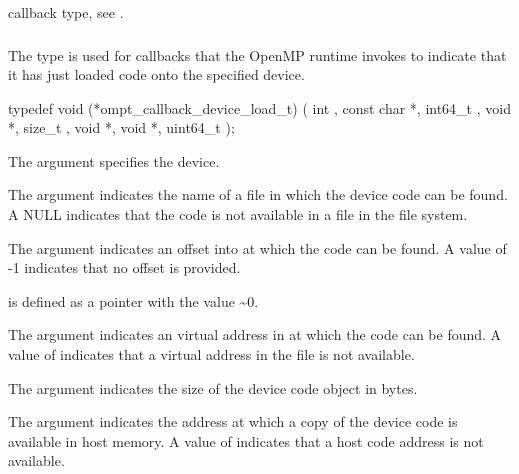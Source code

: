 \begin{crossrefs}
\item {} callback type, 
see .
\end{crossrefs}
\subsubsection{}
\label{sec:ompt_callback_device_load_t}

\summary
The  type is used for callbacks that 
the OpenMP runtime invokes to indicate that it has just loaded code onto 
the specified device.

\format
\begin{ccppspecific}
\begin{omptCallback}
typedef void (*ompt_callback_device_load_t) (
  int ,
  const char *,
  int64_t ,
  void *,
  size_t ,
  void *,
  void *,
  uint64_t 
);
\end{omptCallback}
\end{ccppspecific}

\argdesc
The  argument specifies the device.

The  argument indicates the name of a file in which the device 
code can be found. A NULL  indicates that the code is not available 
in a file in the file system.

The  argument indicates an offset into  at 
which the code can be found. A value of -1 indicates that no offset is provided.

 is defined as a pointer with the value \textasciitilde 0.

The  argument indicates an virtual address in  
at which the code can be found. A value of  indicates that 
a virtual address in the file is not available.

The  argument indicates the size of the device code object in bytes.

The  argument indicates the address at which a copy of the device 
code is available in host memory. A value of  indicates that 
a host code address is not available.

